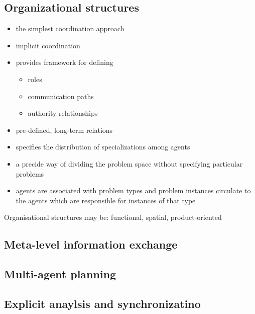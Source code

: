 \subsection{Organizational structures}
\begin{itemize}
\item the simplest coordination approach
\item implicit coordination
\item provides framework for defining
\begin{itemize}
\item roles
\item communication paths
\item authority relationships
\end{itemize}
\item pre-defined, long-term relations
\item specifies the distribution of specializations among agents
\item a precide way of dividing the problem space without specifying particular problems
\item agents are associated with problem types and problem instances circulate to the agents which are responsible for instances of that type
\end{itemize}

Organisational structures may be: functional, spatial, product-oriented

\subsection{Meta-level information exchange}

\subsection{Multi-agent planning}

\subsection{Explicit anaylsis and synchronizatino}





















